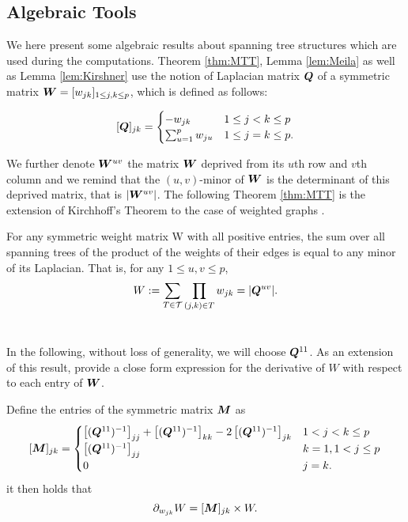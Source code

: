 \tocless \subsection{Algebraic Tools} \label{app:tools}
 We here present some algebraic results about spanning tree structures which are used during the computations. Theorem \ref{thm:MTT}, Lemma \ref{lem:Meila} as well as Lemma \ref{lem:Kirshner} use the notion of Laplacian matrix  ${\boldsymbol{Q}}$ of a symmetric matrix ${\boldsymbol{W}}=[w_{jk} ]_{1\leq j,k\leq p}$, which is defined as follows:
 
\[
 [{\boldsymbol{Q}}]_{jk}  =\begin{cases}
    -w_{jk}  & 1\leq j<k \leq p\\
    \sum_{u=1}^p w_{ju} & 1\leq j=k \leq p.
    \end{cases}
\]
 
We further denote ${\boldsymbol{W}}^{uv}$ the matrix ${\boldsymbol{W}}$ deprived from its $u$th row and $v$th column and we remind that the $(u, v)$-minor of ${\boldsymbol{W}}$ is the determinant of this deprived matrix, that is $|{\boldsymbol{W}}^{uv}|$.
The following Theorem \ref{thm:MTT} is the extension of Kirchhoff's Theorem to the case of weighted graphs \citep{matrixtree,MeilaJaak}.\\
\begin{theorem} \label{thm:MTT}
    For any symmetric weight matrix W with all positive entries, the sum over all spanning trees of the product of the weights of their edges is equal to any minor of its Laplacian. That is, for any $1 \leq u, v \leq p$,
   \[
    W := \sum_{T\in\mathcal{T}} \prod_{(j, k)\in T} w_{jk} = |{\boldsymbol{Q}}^{uv}|.
    \]\\
\end{theorem}    

In the following, without loss of generality, we will choose ${\boldsymbol{Q}}^{11}$. As an extension of this result, \cite{MeilaJaak} provide a close form expression for the derivative of $W$ with respect to each entry of ${\boldsymbol{W}}$. 

\begin{lemma}  \label{lem:Meila}
    Define the entries of the symmetric matrix ${\boldsymbol{M}}$ as
 \[    
 [{\boldsymbol{M}}]_{jk} =\begin{cases}
    \left[({\boldsymbol{Q}}^{11})^{-1}\right]_{jj} + \left[({\boldsymbol{Q}}^{11})^{-1}\right]_{kk} -2\left[({\boldsymbol{Q}}^{11})^{-1}\right]_{jk} & 1< j<k \leq p\\
    \left[({\boldsymbol{Q}}^{11})^{-1}\right]_{jj} & k=1, 1< j \leq p  \\
    0 &  j=k .
    \end{cases}
\]
it then holds that $$\partial_{w_{jk}} W = [{\boldsymbol{M}}]_{jk}  \times W.$$\\
\end{lemma}

